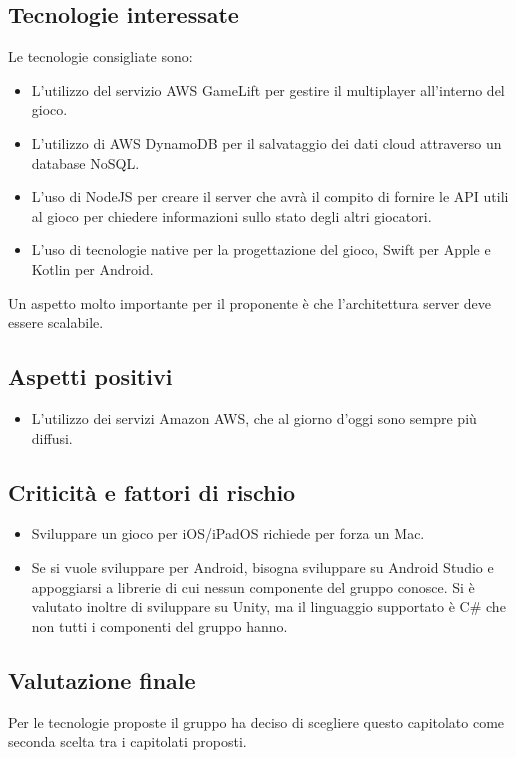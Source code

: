 \subsection{Tecnologie interessate}
Le tecnologie consigliate sono:
\begin{itemize}
\item L'utilizzo del servizio AWS GameLift per gestire il multiplayer all'interno del gioco.
\item L'utilizzo di AWS DynamoDB per il salvataggio dei dati cloud attraverso un database NoSQL.
\item L'uso di NodeJS per creare il server che avrà il compito di fornire le API utili al gioco per chiedere informazioni sullo stato degli altri giocatori.
\item L'uso di tecnologie native per la progettazione del gioco, Swift per Apple e Kotlin per Android.
\end{itemize}
Un aspetto molto importante per il proponente è che l'architettura server deve essere scalabile.

\subsection{Aspetti positivi}
\begin{itemize}
\item L'utilizzo dei servizi Amazon AWS, che al giorno d'oggi sono sempre più diffusi.
\end{itemize}

\subsection{Criticità e fattori di rischio}
\begin{itemize}
\item Sviluppare un gioco per iOS/iPadOS richiede per forza un Mac.
\item Se si vuole sviluppare per Android, bisogna sviluppare su Android Studio e appoggiarsi a librerie di cui nessun componente del gruppo conosce. 
Si è valutato inoltre di sviluppare su Unity, ma il linguaggio supportato è C\# che non tutti i componenti del gruppo hanno.
\end{itemize}

\subsection{Valutazione finale}
Per le tecnologie proposte il gruppo \Gruppo{} ha deciso di scegliere questo capitolato come seconda scelta tra i capitolati proposti.